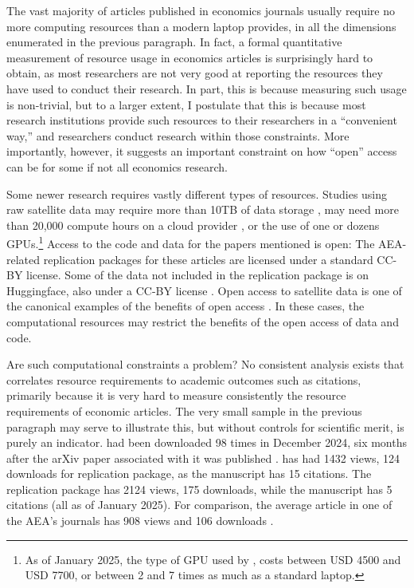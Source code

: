 \documentclass{article}
\begin{document}
The vast majority of articles published in economics journals usually require no more computing resources than a modern laptop provides, in all the dimensions enumerated in the previous paragraph. In fact, a formal quantitative measurement of resource usage in economics articles is surprisingly hard to obtain, as most researchers are not very good at reporting the resources they have used to conduct their research. In part, this is because measuring such usage is non-trivial, but to a larger extent, I postulate that this is because most research institutions provide such resources to their researchers in a ``convenient way,'' and researchers conduct research within those constraints. More importantly, however, it suggests an important constraint on how ``open'' access can be for some if not all economics research.

Some newer research requires vastly different types of resources. Studies using raw satellite data may require more than 10TB of data storage \citep{khachiyan_using_2022,khachiyan_data_2022}, may need more than 20,000 compute hours on a cloud provider \citep{rudik_optimal_2020,rudik_data_2020}, or the use of one \citep{dell_deep_2024,dell_data_2025} or dozens \citep{khachiyan_data_2022} \acp{GPU}.\footnote{As of January 2025, the type of \ac{GPU} used by \citet{dell_data_2025}, costs between USD 4500 and USD 7700, or between 2 and 7 times as much as a standard laptop.} Access to the code and data for the papers mentioned is open: The AEA-related replication packages for these articles are licensed under a standard \ac{CC-BY} license. Some of the data not included in the \citet{dell_data_2025} replication package is on Huggingface, also under a \ac{CC-BY} license \citep{silcock_newswire_2024}. Open access to satellite data is one of the canonical examples of the benefits of open access \citep{nagaraj_improving_2020}. In these cases, the computational resources may restrict the benefits of the open access of data and code.

Are such computational constraints a problem? No consistent analysis exists that correlates resource requirements to academic outcomes such as citations, primarily because it is very hard to measure consistently the resource requirements of economic articles. The very small sample in the previous paragraph may serve to illustrate this, but without controls for scientific merit, is purely an indicator. \citet{silcock_newswire_2024} had been downloaded 98 times in December 2024, six months after the arXiv paper associated with it was published \citep{silcock_newswire_2024}. \citet{rudik_data_2020} has had  1432 views, 124 downloads for replication package, as the manuscript \citep{rudik_optimal_2020} has 15 citations. The replication package \citet{khachiyan_data_2022} has  2124 views, 175 downloads, while the manuscript \citep{khachiyan_using_2022} has 5 citations (all as of January 2025). For comparison, the average article in one of the \ac{AEA}'s journals has 908 views and 106 downloads \citep[Table 4]{vilhuber_report_2025}.
\end{document}
